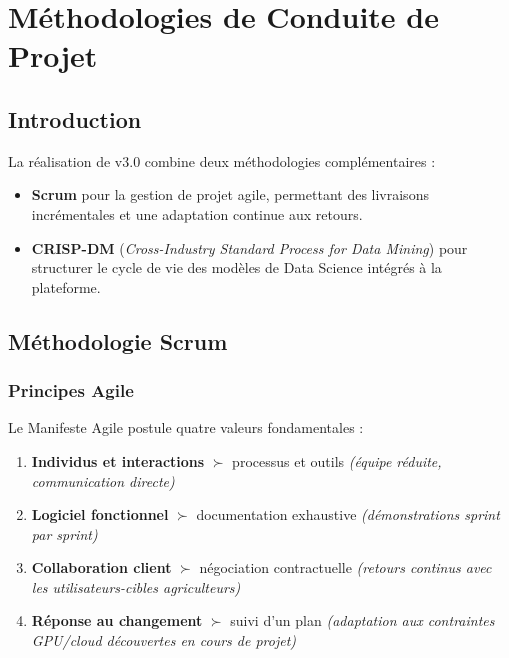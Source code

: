 \chapter{Méthodologies de Conduite de Projet}
\thispagestyle{fancy}

\section{Introduction}

La réalisation de \farmAI{} v3.0 combine deux méthodologies complémentaires :

\begin{itemize}
  \item \textbf{Scrum} pour la gestion de projet agile, permettant des livraisons
        incrémentales et une adaptation continue aux retours.
  \item \textbf{CRISP-DM} (\textit{Cross-Industry Standard Process for Data Mining})
        pour structurer le cycle de vie des modèles de Data Science intégrés à la
        plateforme.
\end{itemize}

\section{Méthodologie Scrum}

\subsection{Principes Agile}

Le Manifeste Agile \cite{beck2001agile} postule quatre valeurs fondamentales :

\begin{tcolorbox}[infobox, title={Les 4 valeurs Agile appliquées à FARM AI}]
\begin{enumerate}
  \item \textbf{Individus et interactions} $\succ$ processus et outils
        \textit{(équipe réduite, communication directe)}
  \item \textbf{Logiciel fonctionnel} $\succ$ documentation exhaustive
        \textit{(démonstrations sprint par sprint)}
  \item \textbf{Collaboration client} $\succ$ négociation contractuelle
        \textit{(retours continus avec les utilisateurs-cibles agriculteurs)}
  \item \textbf{Réponse au changement} $\succ$ suivi d'un plan
        \textit{(adaptation aux contraintes GPU/cloud découvertes en cours de projet)}
\end{enumerate}
\end{tcolorbox}


